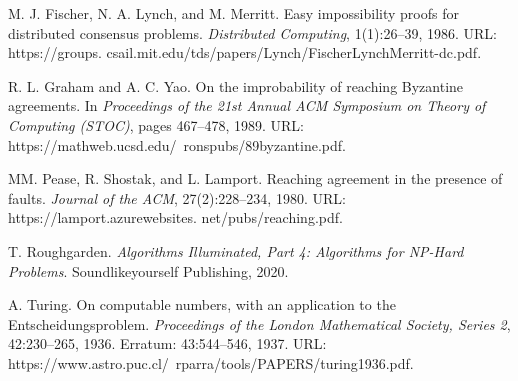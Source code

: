 \begingroup
\let\clearpage\relax
\begin{thebibliography}{5}
M. J. Fischer, N. A. Lynch, and M. Merritt. Easy impossibility proofs for distributed
consensus problems.\textit{ Distributed Computing}, 1(1):26–39, 1986. URL: https://groups.
csail.mit.edu/tds/papers/Lynch/FischerLynchMerritt-dc.pdf.

R. L. Graham and A. C. Yao. On the improbability of reaching Byzantine agreements. In
\textit{Proceedings of the 21st Annual ACM Symposium on Theory of Computing (STOC)}, pages
467–478, 1989. URL: https://mathweb.ucsd.edu/~ronspubs/89\textunderscore byzantine.pdf.

MM. Pease, R. Shostak, and L. Lamport. Reaching agreement in the presence of faults.
\textit{Journal of the ACM}, 27(2):228–234, 1980. URL: https://lamport.azurewebsites.
net/pubs/reaching.pdf.

T. Roughgarden. \textit{Algorithms Illuminated, Part 4: Algorithms for NP-Hard Problems}.
Soundlikeyourself Publishing, 2020.

A. Turing. On computable numbers, with an application to the Entscheidungsproblem.
\textit{Proceedings of the London Mathematical Society, Series 2}, 42:230–265, 1936. Erratum:
43:544–546, 1937. URL: https://www.astro.puc.cl/~rparra/tools/PAPERS/turing\textunderscore1936.pdf.
\end{thebibliography}
\endgroup








